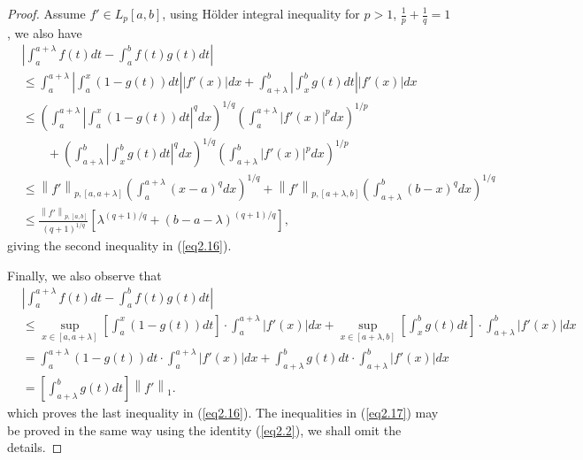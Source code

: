 \documentclass{amsart}
\theoremstyle{plain}
\numberwithin{equation}{section}
\begin{document}
\begin{proof}
Assume $f' \in L_{p}[a,b]$, using H\"{o}lder integral inequality
for $p>1$, $\frac{1}{p} + \frac{1}{q} = 1$, we also have
\begin{align*}
&\left| {\int_a^{a + \lambda } {f\left( t \right)dt}  - \int_a^b
{f\left( t \right)g\left( t \right)dt} } \right|
\\
&\le \int_a^{a + \lambda } { \left| {\int_a^x {\left( {1 - g\left(
t \right)} \right)dt} } \right|\left| {f'\left( x \right)}
\right|dx} + \int_{a + \lambda }^b {\left| {\int_x^b {g\left( t
\right)dt} } \right| \left| {f'\left( x \right)} \right| dx}
\\
&\le  \left( {\int_a^{a + \lambda } { \left| {\int_a^x {\left( {1
- g\left( t \right)} \right)dt} } \right|^q dx}} \right)^{1/q}
\left( {\int_a^{a + \lambda } {\left| {f'\left( x \right)}
\right|^p dx}} \right)^{1/p}
\\
&\qquad+ \left( {\int_{a + \lambda }^b {\left| {\int_x^b {g\left(
t \right)dt} } \right|^q dx}} \right)^{1/q} \left( {\int_{a +
\lambda }^b { \left| {f'\left( x \right)} \right|^p dx}}
\right)^{1/p}
\\
&\le  \left\| {f'} \right\|_{p ,\left[ {a,a + \lambda } \right]}
\left( {\int_a^{a + \lambda } { \left( {x - a} \right)^qdx} }
\right)^{1/q} + \left\| {f'} \right\|_{p,\left[ {a + \lambda ,b}
\right]} \left( {\int_{a + \lambda }^b {\left( {b - x }
\right)^qdx}} \right)^{1/q}
\\
&\le \frac{\left\| {f'} \right\|_{p ,\left[ {a,b}
\right]}}{{\left( {q + 1} \right)^{1/q} }} \left[ {\lambda
^{\left( {q + 1} \right)/q}  + \left( {b - a - \lambda }
\right)^{\left( {q + 1} \right)/q} } \right],
\end{align*}
giving the second inequality in (\ref{eq2.16}).

Finally, we also observe that
\begin{align*}
&\left| {\int_a^{a + \lambda } {f\left( t \right)dt}  - \int_a^b
{f\left( t \right)g\left( t \right)dt} } \right|
\\
&\le \mathop {\sup }\limits_{x \in \left[ {a,a + \lambda }
\right]} \left[ {\int_a^x {\left( {1 - g\left( t \right)}
\right)dt} } \right] \cdot \int_a^{a + \lambda } \left|
f'\left(x\right) \right|dx + \mathop {\sup }\limits_{x \in \left[
{a + \lambda ,b} \right]} \left[ {\int_x^b {g\left( t \right)dt} }
\right] \cdot \int_{a + \lambda }^b
\left|f'\left(x\right)\right|dx
\\
&=\int_a^{a + \lambda } {\left( {1 - g\left( t \right)} \right)dt}
\cdot \int_a^{a + \lambda } \left| f'\left(x\right) \right|dx+
\int_{a + \lambda }^b {g\left( t \right)dt} \cdot \int_{a +
\lambda }^b \left|f'\left(x\right)\right|dx
\\
&= \left[ \int_{a + \lambda }^b {g\left( t \right)dt}
\right]\left\| {f'} \right\|_1.
\end{align*}
which proves the last inequality in (\ref{eq2.16}). The
inequalities in (\ref{eq2.17}) may be proved in the same way using
the identity (\ref{eq2.2}), we shall omit the details.
\end{proof}
\end{document}
